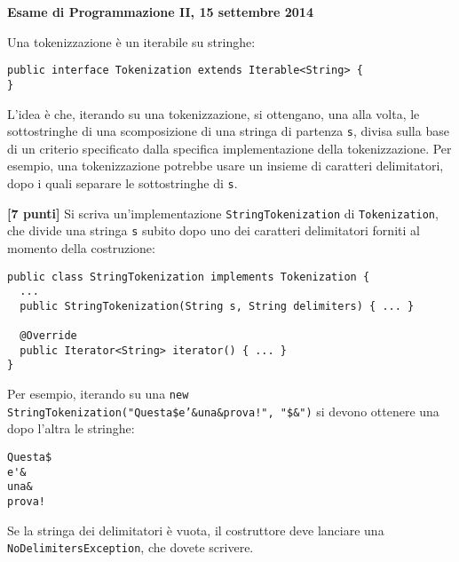 \documentclass{article}[10pt]
\newcounter{esnu}
\newenvironment{esercizio}{\medskip \noindent {\bf Esercizio\addtocounter{esnu}{1} \arabic{esnu}}}{}
\begin{document}
\begin{center} {\bf Esame di Programmazione II, 15 settembre 2014}\end{center}

Una tokenizzazione \`e un iterabile su stringhe:

{\small\begin{verbatim}
public interface Tokenization extends Iterable<String> {
}
\end{verbatim}}

\noindent
L'idea \`e che, iterando su una tokenizzazione, si ottengano,
una alla volta, le sottostringhe di una scomposizione di una stringa di partenza
\texttt{s}, divisa sulla base di un criterio
specificato dalla specifica implementazione della tokenizzazione. Per esempio, una tokenizzazione
potrebbe usare un insieme di caratteri delimitatori, dopo i quali separare le sottostringhe di
\texttt{s}.

\begin{esercizio}
\textbf{[7 punti]}
%
Si scriva un'implementazione \texttt{StringTokenization} di \texttt{Tokenization}, che divide
una stringa \texttt{s}
subito dopo uno dei caratteri delimitatori forniti al momento della costruzione:

{\small
\begin{verbatim}
public class StringTokenization implements Tokenization {
  ...
  public StringTokenization(String s, String delimiters) { ... }

  @Override
  public Iterator<String> iterator() { ... }
}
\end{verbatim}}

\noindent
Per esempio, iterando su una \texttt{new StringTokenization("Questa\$e'\&una\&prova!", "\$\&")} si
devono ottenere una dopo l'altra le stringhe:

{\small
\begin{verbatim}
Questa$
e'&
una&
prova!
\end{verbatim}}

\noindent
Se la stringa dei delimitatori \`e vuota, il costruttore deve lanciare una
\texttt{NoDelimitersException}, che dovete scrivere.
\end{esercizio}
\end{document}
